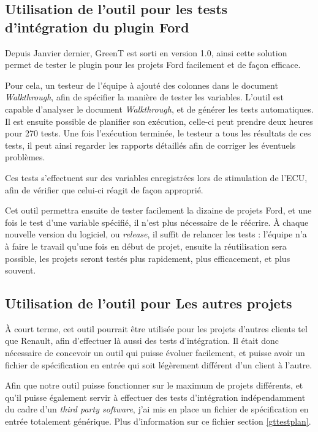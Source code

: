 	\subsection{Utilisation de l'outil pour les tests d'intégration du plugin Ford}
		Depuis Janvier dernier, GreenT est sorti en version 1.0, ainsi cette solution permet de tester le plugin pour les projets Ford facilement et de façon efficace.
		
		 Pour cela, un testeur de l'équipe à ajouté des colonnes dans le document \textit{Walkthrough}, afin de spécifier la manière de tester les variables. L'outil est capable d'analyser le document \textit{Walkthrough}, et de générer les tests automatiques. Il est ensuite possible de planifier son exécution, celle-ci peut prendre deux heures pour 270 tests. Une fois l'exécution terminée, le testeur a tous les résultats de ces tests, il peut ainsi regarder les rapports détaillés afin de corriger les éventuels problèmes.
	
	Ces tests s'effectuent sur des variables enregistrées lors de stimulation de l'ECU, afin de vérifier que celui-ci réagit de façon approprié.

	Cet outil permettra ensuite de tester facilement la dizaine de projets Ford, et une fois le test d'une variable spécifié, il n'est plus nécessaire de le réécrire. À chaque nouvelle version du logiciel, ou \textit{release}, il suffit de relancer les tests : l'équipe n'a à faire le travail qu'une fois en début de projet, ensuite la réutilisation sera possible, les projets seront testés plus rapidement, plus efficacement, et plus souvent.

	\subsection{Utilisation de l'outil pour Les autres projets}
	À court terme, cet outil pourrait être utilisée pour les projets d'autres clients tel que Renault, afin d'effectuer là aussi des tests d'intégration. Il était donc nécessaire de concevoir un outil qui puisse évoluer facilement, et puisse avoir un fichier de spécification en entrée qui soit légèrement différent d'un client à l'autre.
	
	Afin que notre outil puisse fonctionner sur le maximum de projets différents, et qu'il puisse également servir à effectuer des tests d'intégration indépendamment du cadre d'un \textit{third party software}, j'ai mis en place un fichier de spécification en entrée totalement générique. Plus d'information sur ce fichier section \ref{gttestplan}.
	
